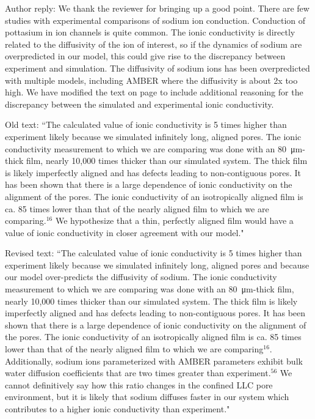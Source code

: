 \documentclass{article}
\begin{document}
\begin{enumerate}
	Author reply: We thank the reviewer for bringing up a good point. There are few studies
	with experimental comparisons of sodium ion conduction. Conduction of pottasium in 
	ion channels is quite common. The ionic conductivity is directly related to the 
	diffusivity of the ion of interest, so if the dynamics of sodium are overpredicted
	in our model, this could give rise to the discrepancy between experiment and simulation.
	The diffusivity of sodium ions has been overpredicted with multiple models, including AMBER
	where the diffusivity is about 2x too high. We have modified the text on page
	\pageref{M-modification:conductivity} to include additional reasoning for the 
	discrepancy between the simulated and experimental ionic conductivity.  
	
	Old text: ``The calculated value of ionic conductivity is 5 times higher than experiment 
    likely because we simulated infinitely long, aligned pores. The ionic conductivity 
    measurement to which we are comparing was done with an \SI{80}{\micro\metre}-thick film, 
    nearly 10,000 times thicker than our simulated system. The thick film is likely 
    imperfectly aligned and has defects leading to non-contiguous pores. It has been shown
    that there is a large dependence of ionic conductivity on the alignment of the pores.
    The ionic conductivity of an isotropically aligned film is ca. 85 times lower than that
    of the nearly aligned film to which we are comparing.$^{16}$ We 
    hypothesize that a thin, perfectly aligned film would have a value of ionic conductivity
    in closer agreement with our model."
    
    Revised text: ``The calculated value of ionic conductivity is 5 times higher than
    experiment likely because we simulated infinitely long, aligned pores {\color{red} and
    because our model over-predicts the diffusivity of sodium}. The ionic conductivity 
    measurement to which we are comparing was done with an \SI{80}{\micro\metre}-thick film, 
    nearly 10,000 times thicker than our simulated system. The thick film is likely 
    imperfectly aligned and has defects leading to non-contiguous pores. It has been shown
    that there is a large dependence of ionic conductivity on the alignment of the pores.
    The ionic conductivity of an isotropically aligned film is ca. 85 times lower than that
    of the nearly aligned film to which we are comparing$^{16}$. 
    {\color{red} Additionally, sodium ions parameterized with AMBER parameters exhibit bulk
    water diffusion coefficients that are two times greater than experiment.$^{56}$ We cannot 
    definitively say how this ratio changes in the confined LLC pore environment, but
    it is likely that sodium diffuses faster in our system which contributes to a higher 
    ionic conductivity than experiment.}"
	

\end{enumerate}
\end{document}
